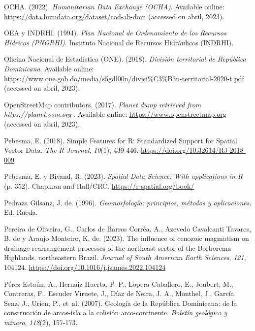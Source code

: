\documentclass[spanish]{article}
\newlength{\cslhangindent}
\newlength{\cslentryspacingunit} %
\newenvironment{CSLReferences}[2] %
 {%
  \setlength{\parindent}{0pt}
  \ifodd #1
  \let\oldpar\par
  \def\par{\hangindent=\cslhangindent\oldpar}
  \fi
  \setlength{\parskip}{#2\cslentryspacingunit}
 }%
 {}
\begin{document}
\begin{CSLReferences}{1}{0}
\leavevmode{}%
OCHA. (2022). \emph{{Humanitarian Data Exchange (OCHA)}}. Available
online: \url{https://data.humdata.org/dataset/cod-ab-dom} (accessed on
abril, 2023).

\leavevmode{}%
OEA y INDRHI. (1994). \emph{{Plan Nacional de Ordenamiento de los
Recursos Hídricos (PNORHI)}}. {Instituto Nacional de Recursos
Hidráulicos (INDRHI)}.

\leavevmode{}%
Oficina Nacional de Estadística (ONE). (2018). \emph{{División
territorial de República Dominicana}}. Available online:
\url{https://www.one.gob.do/media/s5gdl00n/divisi\%C3\%B3n-territorial-2020-t.pdf}
(accessed on abril, 2023).

\leavevmode{}%
OpenStreetMap contributors. (2017). \emph{{Planet dump retrieved from
https://planet.osm.org }}. Available online:
\url{https://www.openstreetmap.org} (accessed on abril, 2023).

\leavevmode{}%
Pebesma, E. (2018). {Simple Features for R: Standardized Support for
Spatial Vector Data}. \emph{{The R Journal}}, \emph{10}(1), 439-446.
\url{https://doi.org/10.32614/RJ-2018-009}

\leavevmode{}%
Pebesma, E. y Bivand, R. (2023). \emph{{Spatial Data Science: With
applications in R}} (p. 352). {Chapman and Hall/CRC}.
\url{https://r-spatial.org/book/}

\leavevmode{}%
Pedraza Gilsanz, J. de. (1996). \emph{Geomorfología: principios, métodos
y aplicaciones}. Ed. Rueda.

\leavevmode{}%
Pereira de Oliveira, G., Carlos de Barros Corrêa, A., Azevedo Cavalcanti
Tavares, B. de y Araujo Monteiro, K. de. (2023). The influence of
cenozoic magmatism on drainage rearrangement processes of the northeast
sector of the {Borborema} {Highlands}, northeastern {Brazil}.
\emph{Journal of South American Earth Sciences}, \emph{121}, 104124.
\url{https://doi.org/10.1016/j.jsames.2022.104124}

\leavevmode{}%
Pérez Estaún, A., Hernáiz Huerta, P. P., Lopera Caballero, E., Joubert,
M., Contreras, F., Escuder Viruete, J., Díaz de Neira, J. A., Monthel,
J., García Senz, J., Urien, P., et~al. (2007). {Geología de la República
Dominicana: de la construcción de arcos-isla a la colisión
arco-continente}. \emph{Boletín geológico y minero}, \emph{118}(2),
157-173.


\end{CSLReferences}
\end{document}
